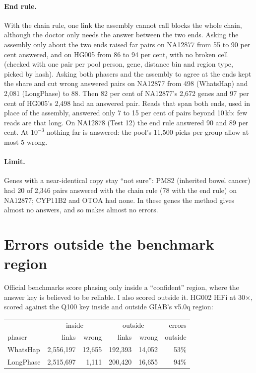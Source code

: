 \documentclass[11pt]{article}
\begin{document}
\paragraph{End rule.} With the chain rule, one link the assembly cannot
call blocks the whole chain, although the doctor only needs the answer
between the two ends. Asking the assembly only about the two ends raised far pairs on
NA12877 from 55 to 90 per cent answered, and on HG005 from 86 to 94 per
cent, with no broken cell (checked with one pair per pool person, gene,
distance bin and region type, picked by hash).
Asking both phasers and the assembly to agree at the ends kept the share
and cut wrong answered pairs on NA12877 from 498 (WhatsHap) and 2{,}081
(LongPhase) to 88. Then 82 per cent of NA12877's 2{,}672 genes and 97 per
cent of HG005's 2{,}498 had an answered pair. Reads that span both ends,
used in place of the assembly, answered only 7 to 15 per cent of pairs
beyond 10\,kb: few reads are that long. On NA12878 (Test 12) the end rule
answered 90 and 89 per cent. At $10^{-3}$ nothing far is answered: the
pool's 11{,}500 picks per group allow at most 5 wrong.

\paragraph{Limit.} Genes with a near-identical copy stay \enquote{not sure}: PMS2
(inherited bowel cancer) had 20 of 2{,}346 pairs answered with the chain rule
(78 with the end rule) on NA12877; CYP11B2 and OTOA had none. In these
genes the method gives almost no answers, and so makes almost no errors.

\section{Errors outside the benchmark region}\label{sec:outside}

Official benchmarks score phasing only inside a \enquote{confident} region, where
the answer key is believed to be reliable. I also scored outside it. HG002
HiFi at 30$\times$, scored against the Q100 key inside and outside GIAB's
v5.0q region:

\begin{center}
\small
\begin{tabular}{@{}lrrrrr@{}}
\toprule
 & \multicolumn{2}{c}{inside} & \multicolumn{2}{c}{outside} & errors\\
phaser & links & wrong & links & wrong & outside\\
\midrule
WhatsHap & 2{,}556{,}197 & 12{,}655 & 192{,}393 & 14{,}052 & 53\%\\
LongPhase & 2{,}515{,}697 & 1{,}111 & 200{,}420 & 16{,}655 & 94\%\\
\bottomrule
\end{tabular}
\end{center}
\end{document}
